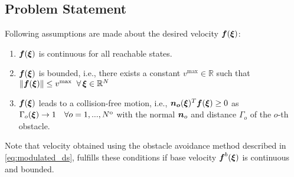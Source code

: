 \subsection{Problem Statement}
Following assumptions are made about the desired velocity $\boldsymbol{f}(\boldsymbol{\xi})$:
\begin{enumerate}
    \item $\boldsymbol{f}(\boldsymbol{\xi})$ is continuous for all reachable states.
    \item $\boldsymbol{f}(\boldsymbol{\xi})$ is bounded, i.e., there exists a constant $v^{\mathrm{max}} \in \mathbb{R}$ such that $\| \boldsymbol{f}(\boldsymbol{\xi}) \| \leq v^{\mathrm{max}} \;\; \forall \, \boldsymbol{\xi} \in \mathbb{R}^N$
    \item $\boldsymbol{f}(\boldsymbol{\xi})$ leads to a collision-free motion, i.e., $\boldsymbol{n_o}(\boldsymbol{\xi})^T \boldsymbol{f}(\boldsymbol{\xi}) \geq 0$ as $\Gamma_o(\boldsymbol{\xi}) \rightarrow 1 \quad \forall o = 1, ..., N^{\mathrm{o}}$ with the normal $\boldsymbol{n}_o$ and distance $\Gamma_o$ of the $o$-th obstacle. 
\end{enumerate}

Note that velocity obtained using the obstacle avoidance method described in \eqref{eq:modulated_ds}, fulfills these conditions if base velocity $\boldsymbol{f}^b(\boldsymbol{\xi})$ is continuous and bounded.
